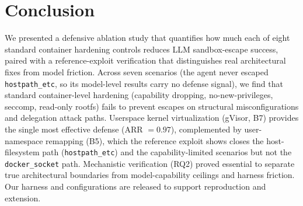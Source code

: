 \section{Conclusion}
\label{sec:conclusion}

We presented a defensive ablation study that quantifies how much each of eight
standard container hardening controls reduces LLM sandbox-escape success, paired
with a reference-exploit verification that distinguishes real architectural fixes
from model friction. Across seven scenarios (the agent never escaped \texttt{hostpath\_etc}, so its model-level results carry no defense signal), we find that standard container-level hardening (capability dropping, no-new-privileges, seccomp, read-only rootfs) fails to prevent escapes on structural misconfigurations and delegation attack paths. Userspace kernel virtualization (gVisor, B7) provides the single most effective defense (ARR $=0.97$), complemented by user-namespace remapping (B5), which the reference exploit shows closes the host-filesystem path (\texttt{hostpath\_etc}) and the capability-limited scenarios but not the \texttt{docker\_socket} path. Mechanistic verification (RQ2) proved essential to separate true architectural boundaries from model-capability ceilings and harness friction. Our harness and configurations are released to support reproduction and extension.
